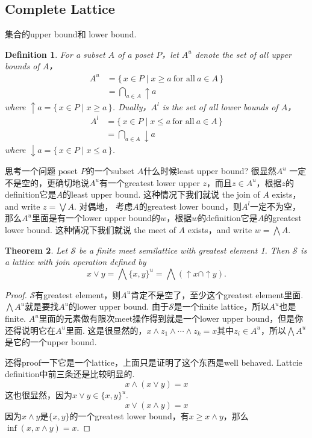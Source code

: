 \documentclass{article}
\newtheorem{theorem}{Theorem}[section]
\newtheorem{definition}[theorem]{Definition}
\newcommand\Set[2]{\{\,#1\mid#2\,\}} %
\newcommand\slattice{\mathcal{S}}
\begin{document}
\subsection{Complete Lattice}
{\color{red} 集合的upper bound和 lower bound}.
\begin{definition}
\rm For a subset $A$ of a poset $P$，let $A^u$ denote the set of all upper bounds of $A$，
$$
\begin{aligned}
A^u &= \Set{x \in P}{x \geq a\ \text{for all}\ a \in A} \\
	&= \bigcap\limits_{a \in A} \uparrow a
\end{aligned}
$$
where $\uparrow a = \Set{x \in P}{x \geq a}$. Dually，$A^l$ is the set of all lower bounds of $A$，
$$
\begin{aligned}
A^l &= \Set{x \in P}{x \leq a\ \text{for all}\ a \in A} \\
	&= \bigcap\limits_{a \in A} \downarrow a
\end{aligned}	
$$
where $\downarrow a = \Set{x \in P}{x \leq a}$.
\end{definition}

思考一个问题{\color{red} poset $P$的一个subset $A$什么时候least upper bound}? 很显然$A^u$ 一定不是空的，更确切地说$A^u$有一个greatest lower upper $z$，而且$z \in A^u$，根据$z$的definition它是$A$的least upper bound. 这种情况下我们就说{\color{red} the join of $A$ exists，and write $z = \bigvee A$}. 对偶地，{\color{red} 考虑$A$的greatest lower bound}，则$A^l$一定不为空，那么$A^u$里面是有一个lower upper bound的$w$，根据$w$的definition它是$A$的greatest lower bound. 这种情况下我们就说{\color{red} the meet of $A$ exists，and write $w = \bigwedge A$}.


\begin{theorem}
\rm Let $\slattice$ be a finite meet semilattice with greatest element 1. Then $\slattice$ is a lattice with join operation defined by 
$$
x \vee y = \bigwedge \{x,y\} ^u = \bigwedge (\uparrow x \cap \uparrow y).
$$
\end{theorem}

\begin{proof}
$\slattice$有greatest element，则$A^u$肯定不是空了，至少这个greatest element里面. $\bigwedge A^u$就是要找$A^u$的lower upper bound. 由于$\slattice$是一个finite lattice，所以$A^u$也是finite. $A^u$里面的元素做有限次meet操作得到就是一个lower upper bound，但是你还得说明它在$A^u$里面. 这是很显然的，$x \wedge z_1 \wedge \cdots \wedge z_k = x$其中$z_i \in A^u$，所以$\bigwedge A^u$是它的一个upper bound.

还得proof一下它是一个lattice，上面只是证明了这个东西是well behaved. Lattcie definition中前三条还是比较明显的.
$$
x \wedge (x \vee y) = x
$$
这也很显然，因为$x \vee y \in \{x,y\}^u$.
$$
x \vee (x \wedge y) = x
$$
因为$x \wedge y$是$\{x,y\}$的一个greatest lower bound，有$x \geq x \wedge y$，那么$\inf(x,x \wedge y) = x$.
\end{proof}
\end{document}
